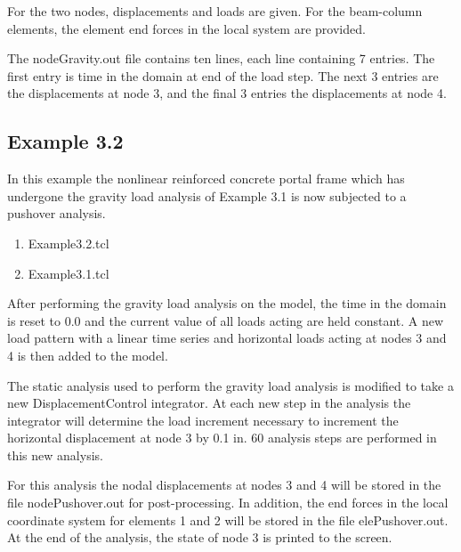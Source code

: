 \documentclass[12pt]{article}
\begin{document}
For the two nodes, displacements and loads are given. For the
beam-column elements, the element end forces in the local
system are provided.

The nodeGravity.out file contains ten lines, each line containing 7 entries. The first entry is 
time in the domain at end of the load step. The next 3 entries are the displacements at node 3,
and the final 3 entries the displacements at node 4.



\pagebreak
\subsection{Example 3.2}
In this example the nonlinear reinforced concrete portal frame which
has undergone the gravity load analysis of Example 3.1 is now
subjected to a pushover analysis.

\vspace{0.2in}  
\begin{enumerate} 
\item Example3.2.tcl
\item Example3.1.tcl
\end{enumerate}

\vspace{0.2in} 

After performing the gravity load analysis on the model, the time in
the domain is reset to 0.0 and the current value of all loads acting
are held constant. A new load pattern with a linear time series and
horizontal loads acting at nodes 3 and 4 is then added to the model.

\vspace{0.2in}

The static analysis used to perform the gravity load analysis is
modified to take a new DisplacementControl integrator. At each new
step in the analysis the integrator will determine the load increment
necessary to increment the horizontal displacement at node 3 by 0.1 in.
60 analysis steps are performed in this new analysis.

\vspace{0.2in} 

For this analysis the nodal displacements at nodes 3 and 4 will be stored in
the file nodePushover.out for post-processing. In addition, the
end forces in the local coordinate system for elements 1 and 2 will be
stored in the file elePushover.out. At the end of the analysis, the
state of node 3 is printed to the screen. 
\end{document}
